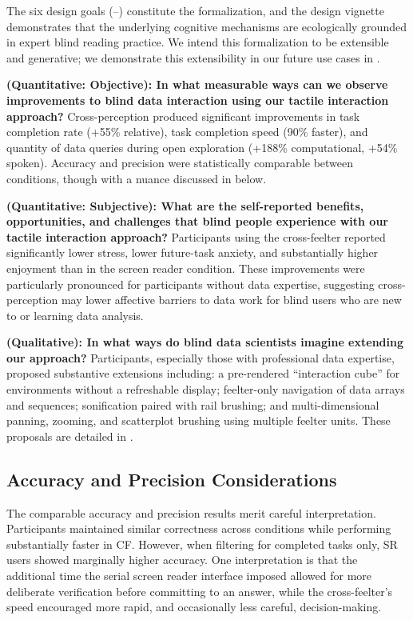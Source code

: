 \documentclass[12pt]{cmuthesis}
\begin{document}
The six design goals (--) constitute the formalization, and the design vignette demonstrates that the underlying cognitive mechanisms are ecologically grounded in expert blind reading practice. We intend this formalization to be extensible and generative; we demonstrate this extensibility in our future use cases in .

\noindent\textbf{ (Quantitative: Objective): In what measurable ways can we observe improvements to blind data interaction using our tactile interaction approach?} Cross-perception produced significant improvements in task completion rate (+55\% relative), task completion speed (90\% faster), and quantity of data queries during open exploration (+188\% computational, +54\% spoken). Accuracy and precision were statistically comparable between conditions, though with a nuance discussed in  below.

\noindent\textbf{ (Quantitative: Subjective): What are the self-reported benefits, opportunities, and challenges that blind people experience with our tactile interaction approach?} Participants using the cross-feelter reported significantly lower stress, lower future-task anxiety, and substantially higher enjoyment than in the screen reader condition. These improvements were particularly pronounced for participants without data expertise, suggesting cross-perception may lower affective barriers to data work for blind users who are new to or learning data analysis.

\noindent\textbf{ (Qualitative): In what ways do blind data scientists imagine extending our approach?} Participants, especially those with professional data expertise, proposed substantive extensions including: a pre-rendered ``interaction cube'' for environments without a refreshable display; feelter-only navigation of data arrays and sequences; sonification paired with rail brushing; and multi-dimensional panning, zooming, and scatterplot brushing using multiple feelter units. These proposals are detailed in . 


\subsection{Accuracy and Precision Considerations}
\label{sec:discussion-accuracy}


The comparable accuracy and precision results merit careful interpretation. Participants maintained similar correctness across conditions while performing substantially faster in CF. However, when filtering for completed tasks only, SR users showed marginally higher accuracy. One interpretation is that the additional time the serial screen reader interface imposed allowed for more deliberate verification before committing to an answer, while the cross-feelter's speed encouraged more rapid, and occasionally less careful, decision-making.
\end{document}
